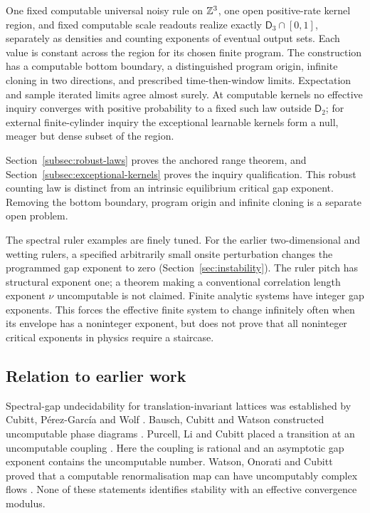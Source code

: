 \begin{theorem}\label{thm:robust-headline}
One fixed computable universal noisy rule on $\mathbb Z^3$, one open
positive-rate kernel region, and fixed computable scale readouts
realize exactly $\mathsf D_3\cap[0,1]$, separately as densities
and counting exponents of eventual output sets. Each value is
constant across the region for its chosen finite program.
The construction has a computable bottom boundary, a distinguished
program origin, infinite cloning in two directions, and prescribed
time-then-window limits. Expectation and sample iterated limits agree
almost surely. At computable kernels no effective inquiry converges
with positive probability to a fixed such law outside $\mathsf D_2$;
for external finite-cylinder inquiry the exceptional learnable kernels
form a null, meager but dense subset of the region.
\end{theorem}
Section~\ref{subsec:robust-laws} proves the anchored range theorem,
and Section~\ref{subsec:exceptional-kernels} proves the inquiry
qualification. This robust counting law is distinct from an intrinsic
equilibrium critical gap exponent. Removing the bottom boundary,
program origin and infinite cloning is a separate open problem.

The spectral ruler examples are finely tuned. For the earlier two-dimensional and
wetting rulers, a specified arbitrarily small onsite perturbation
changes the programmed gap exponent to zero
(Section~\ref{sec:instability}). The ruler pitch has
structural exponent one; a theorem making a conventional correlation
length exponent $\nu$ uncomputable is not claimed. Finite analytic
systems have integer gap exponents. This forces the effective finite
system to change infinitely often when its envelope has a noninteger
exponent, but does not prove that all noninteger critical exponents in
physics require a staircase.

\subsection{Relation to earlier work}
Spectral-gap undecidability for translation-invariant lattices was
established by Cubitt, P\'erez-Garc\'ia and Wolf
\cite{spectralShort,spectralFull}. Bausch, Cubitt and Watson constructed
uncomputable phase diagrams \cite{phaseDiagrams}. Purcell, Li and Cubitt
placed a transition at an uncomputable coupling \cite{chaitinTransition}.
Here the coupling is rational and an asymptotic gap exponent contains
the uncomputable number. Watson, Onorati and Cubitt proved that a
computable renormalisation map can have uncomputably complex flows
\cite{renormalisation}. None of these statements identifies stability
with an effective convergence modulus.


